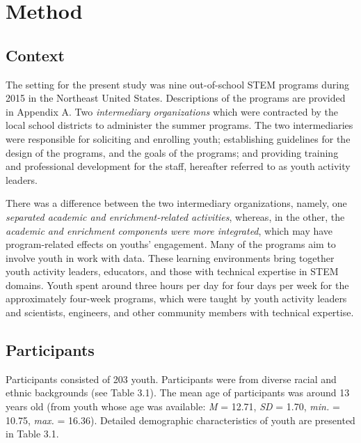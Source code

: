 \documentclass[]{msu-thesis}
\theoremstyle{definition}
\theoremstyle{definition}
\theoremstyle{definition}
\theoremstyle{remark}
\begin{document}
\chapter{Method}\label{method}

\section{Context}\label{context}

The setting for the present study was nine out-of-school STEM programs
during 2015 in the Northeast United States. Descriptions of the programs
are provided in Appendix A. Two \emph{intermediary organizations} which
were contracted by the local school districts to administer the summer
programs. The two intermediaries were responsible for soliciting and
enrolling youth; establishing guidelines for the design of the programs,
and the goals of the programs; and providing training and professional
development for the staff, hereafter referred to as youth activity
leaders.

There was a difference between the two intermediary organizations,
namely, one \emph{separated academic and enrichment-related activities},
whereas, in the other, the \emph{academic and enrichment components were
more integrated}, which may have program-related effects on youths'
engagement. Many of the programs aim to involve youth in work with data.
These learning environments bring together youth activity leaders,
educators, and those with technical expertise in STEM domains. Youth
spent around three hours per day for four days per week for the
approximately four-week programs, which were taught by youth activity
leaders and scientists, engineers, and other community members with
technical expertise.

\section{Participants}\label{participants}

Participants consisted of 203 youth. Participants were from diverse
racial and ethnic backgrounds (see Table 3.1). The mean age of
participants was around 13 years old (from youth whose age was
available: \emph{M} = 12.71, \emph{SD} = 1.70, \emph{min.} = 10.75,
\emph{max.} = 16.36). Detailed demographic characteristics of youth are
presented in Table 3.1.
\end{document}
